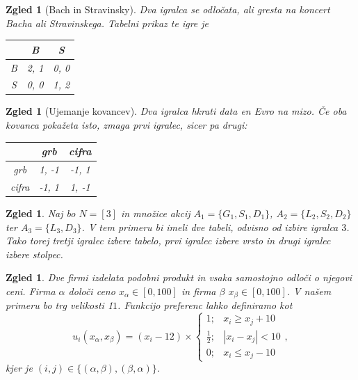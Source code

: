 \documentclass[10pt, a4paper]{article}
\newtheorem{zgled}[izr]{Zgled}
\begin{document}
\begin{zgled}[Bach in Stravinsky]
    Dva igralca se odločata, ali gresta na koncert Bacha ali Stravinskega.
    Tabelni prikaz te igre je 
    \begin{center}
        {\begin{tabular}{c|c|c|}
            & B & S\\
            \hline
            B & 2, 1 & 0, 0\\
            \hline
            S & 0, 0 & 1, 2\\
            \hline
        \end{tabular}}        
    \end{center}
\end{zgled}

\begin{zgled}[Ujemanje kovancev]
    Dva igralca hkrati data en Evro na mizo. Če oba kovanca pokažeta isto, zmaga 
    prvi igralec, sicer pa drugi:
    \begin{center}
        {\begin{tabular}{c|c|c|}
            & \textrm{grb} & \textrm{cifra}\\
            \hline
            \textrm{grb} & 1, -1 & -1, 1\\
            \hline
            \textrm{cifra} & -1, 1 & 1, -1\\
            \hline
        \end{tabular}}        
    \end{center}
\end{zgled}

\begin{zgled}
    Naj bo $N = [3]$ in množice akcij $A_1 = \{G_1, S_1, D_1\}$,
    $A_2 = \{L_2, S_2, D_2\}$ ter $A_3 = \{L_3, D_3\}$.
    V tem primeru bi imeli dve tabeli, odvisno od izbire igralca $3$.
    Tako torej tretji igralec izbere tabelo, prvi igralec izbere vrsto in drugi igralec izbere stolpec.
\end{zgled}

\begin{zgled}
    Dve firmi izdelata podobni produkt in vsaka samostojno odloči o njegovi ceni.
    Firma $\alpha$ določi ceno $x_\alpha \in [0, 100]$ in firma $\beta$ $x_\beta \in [0, 100]$.
    V našem primeru bo trg velikosti 1$1$. Funkcijo preferenc lahko definiramo kot 
    $$u_i (x_\alpha, x_\beta) = (x_i - 12) \times \begin{cases}
        1; & x_i \geq x_j + 10\\
        \frac{1}{2}; & |x_i - x_j| < 10\\
        0; & x_i \leq x_j - 10
    \end{cases},$$ kjer je $(i, j) \in \{(\alpha, \beta), (\beta, \alpha)\}$.
\end{zgled}
\end{document}
